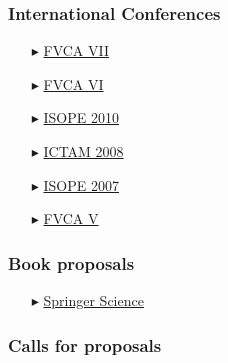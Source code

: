 \separator
\subsubsection{International Conferences}

  \begin{itemize}
  
    \item[$\blacktriangleright$] \href{http://www.wias-berlin.de/workshops/fvca7/}{FVCA VII}
    
    \item[$\blacktriangleright$] \href{http://fvca6.fs.cvut.cz/}{FVCA VI}
    
    \item[$\blacktriangleright$] \href{http://www.isope2010.org/}{ISOPE 2010}
    
    \item[$\blacktriangleright$] \href{http://ictam2008.adelaide.edu.au/}{ICTAM 2008}
    
    \item[$\blacktriangleright$] \href{http://www.isope.org/conferences/conferences.htm}{ISOPE 2007}
    
    \item[$\blacktriangleright$] \href{http://www.latp.univ-mrs.fr/fvca5/}{FVCA V}
    
  \end{itemize}

\separator
\subsubsection{Book proposals}

  \begin{itemize}
    \item[$\blacktriangleright$] \href{http://www.springer.com/}{Springer Science}
  \end{itemize}

\separator
\subsubsection{Calls for proposals}

